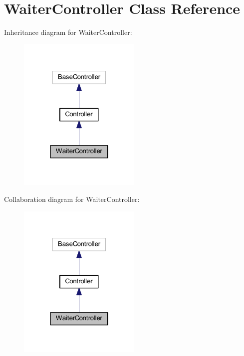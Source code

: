 \hypertarget{class_app_1_1_http_1_1_controllers_1_1_waiter_controller}{}\section{Waiter\+Controller Class Reference}
\label{class_app_1_1_http_1_1_controllers_1_1_waiter_controller}


Inheritance diagram for Waiter\+Controller\+:
\nopagebreak
\begin{figure}[H]
\begin{center}
\leavevmode
\includegraphics[width=166pt]{class_app_1_1_http_1_1_controllers_1_1_waiter_controller__inherit__graph}
\end{center}
\end{figure}


Collaboration diagram for Waiter\+Controller\+:
\nopagebreak
\begin{figure}[H]
\begin{center}
\leavevmode
\includegraphics[width=166pt]{class_app_1_1_http_1_1_controllers_1_1_waiter_controller__coll__graph}
\end{center}
\end{figure}
